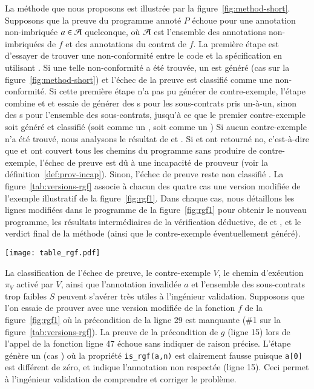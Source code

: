 La méthode que nous proposons est illustrée par la
figure~\ref{fig:method-short}.
Supposons que la preuve du programme annoté $P$ échoue pour une annotation
non-imbriquée $a\in{\ensuremath\mathcal{A}}$ quelconque, où ${\mathcal{A}}$ est l'ensemble des annotations
non-imbriquées de $f$ et des annotations du contrat de $f$.
La première étape est d'essayer de trouver une non-conformité entre le code et
la spécification en utilisant \NCD.
Si une telle non-conformité a été trouvée, un \NCCE est généré (cas 
sur la figure~\ref{fig:method-short}) et l'échec de la preuve est classifié
comme une non-conformité.
Si cette première étape n'a pas pu générer de contre-exemple, l'étape \SWD
combine \SSWD et \GSWD et essaie de générer des \SWCE{}s pour les sous-contrats
pris un-à-un, sinon des \SWCE{}s pour l'ensemble des sous-contrats, jusqu'à ce
que le premier contre-exemple soit généré et classifié (soit comme un \NCCE
{}, soit comme un \SWCE {})
Si aucun contre-exemple n'a été trouvé, nous analysons le résultat de \NCD et
\SWD.
Si \NCD et \SWD ont retourné \textsf{no}, c'est-à-dire que \NCD et \GSWD ont
couvert tous les chemins du programme sans produire de contre-exemple, l'échec
de preuve est dû à une incapacité de prouveur  (voir la
définition~\ref{def:prov-incap}).
Sinon, l'échec de preuve reste non classifié .
La figure~\ref{tab:versions-rgf} associe à chacun des quatre cas une version
modifiée de l'exemple illustratif de la figure~\ref{fig:rgf1}.
Dans chaque cas, nous détaillons les lignes modifiées dans le programme de la
figure~\ref{fig:rgf1} pour obtenir le nouveau programme, les résultats
intermédiaires de la vérification déductive, de \NCD et \SWD, et le verdict
final de la méthode (ainsi que le contre-exemple éventuellement généré).


\begin{figure*}[bt]\centering
  \texttt{[image: table\_rgf.pdf]}
  \caption{Résultats de la méthode sur différentes versions de l'exemple de la
    figure~\ref{fig:rgf1}.}
  \label{tab:versions-rgf}
\end{figure*}


La classification de l'échec de preuve, le contre-exemple $V$, le chemin
d'exécution $\pi_V$ activé par $V$, ainsi que l'annotation invalidée $a$ et
l'ensemble des sous-contrats trop faibles $S$ peuvent s'avérer très utiles à
l'ingénieur validation.
Supposons que l'on essaie de prouver avec \Wp une version modifiée de la
fonction $f$ de la figure~\ref{fig:rgf1} où la précondition de la ligne 29 est
manquante (\#1 sur la figure~\ref{tab:versions-rgf}).
La preuve de la précondition de $g$ (ligne 15) lors de l'appel de la fonction
ligne 47 échoue sans indiquer de raison précise. 
L'étape \NCD génère un \NCCE (cas ) où la propriété
\lstinline'is_rgf(a,n)' est clairement fausse puisque \lstinline'a[0]' est
différent de zéro, et indique l'annotation non respectée (ligne 15).
Ceci permet à l'ingénieur validation de comprendre et corriger le problème.

